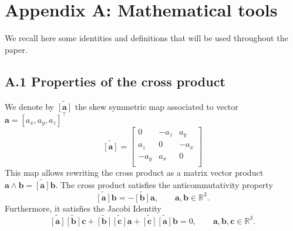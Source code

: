 \documentclass{svjour3}                     %
\newcommand{\crmat}[1]{\ensuremath{\widetilde{\left[#1\right]}}}
\begin{document}
	
	
	
	\section*{Appendix A: Mathematical tools}
	We recall here some identities and definitions that will be used throughout the paper. 
	\subsection*{\normalsize \textbf{A.1 Properties of the cross product}}
	We denote by $\crmat{\bm{a}}$ the skew symmetric map associated to vector $\bm{a} = [a_x, a_y, a_z]^\top$
	\begin{equation}
	\crmat{\bm{a}} = 
	\begin{bmatrix}
	0 & -a_z & a_y \\
	a_z & 0 & -a_x \\
	-a_y & a_x & 0 \\
	\end{bmatrix}
	\end{equation}
	This map allows rewriting the cross product as a matrix vector product $\bm{a}\wedge \bm{b} = \crmat{\bm{a}}\bm{b}$. The cross product satisfies the anticommutativity property
	\begin{equation}
	\label{eq:anticom}
	\crmat{\bm{a}} \bm{b} = - \crmat{\bm{b}} \bm{a}, \qquad \bm{a}, \bm{b} \in \mathbb{R}^3.
	\end{equation}
	Furthermore, it satisfies the Jacobi Identity
	\begin{equation}
	\label{eq:jacobi}
	\crmat{\bm{a}} \crmat{\bm{b}} \bm{c} + \crmat{\bm{b}} \crmat{\bm{c}} \bm{a} + \crmat{\bm{c}} \crmat{\bm{a}} \bm{b} = 0, \qquad \bm{a}, \bm{b}, \bm{c} \in \mathbb{R}^3.
	\end{equation}
	
\end{document}
